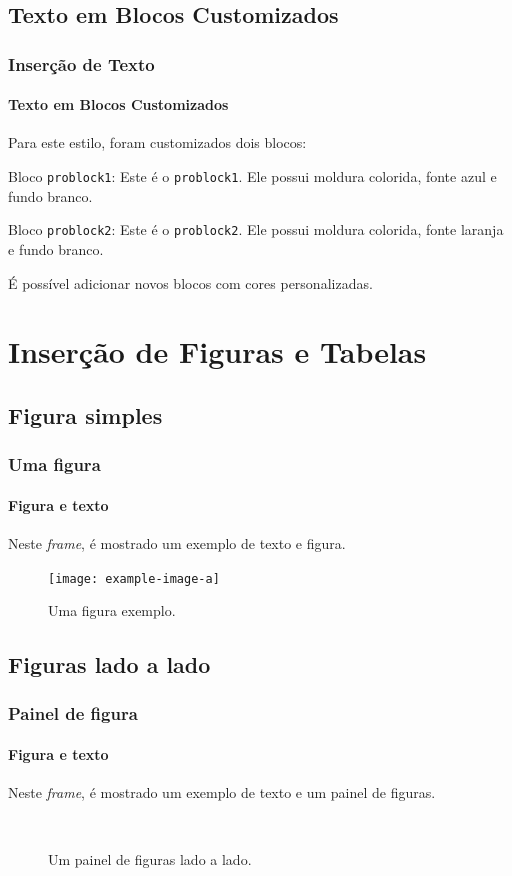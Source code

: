 \documentclass[10pt,aspectratio=169]{beamer}
\begin{document}
\subsection{Texto em Blocos Customizados}

\begin{frame}
\frametitle{Inserção de Texto}
\framesubtitle{Texto em Blocos Customizados}
Para este estilo, foram customizados dois blocos:
\begin{problock1}{Bloco {\tt problock1}:}
Este é o {\tt problock1}. Ele possui moldura colorida, fonte azul e fundo branco.
\end{problock1}

\pause

\begin{problock2}{Bloco {\tt problock2}:}
Este é o {\tt problock2}. Ele possui moldura colorida, fonte laranja e fundo branco.
\end{problock2}

\pause

É possível adicionar novos blocos com cores personalizadas.
\end{frame}

\section{Inserção de Figuras e Tabelas}

\subsection{Figura simples}

\begin{frame}
\frametitle{Uma figura}
\framesubtitle{Figura e texto}
Neste \textit{frame}, é mostrado um exemplo de texto e figura.
\pause
\begin{figure}
	\centering
	\texttt{[image: example-image-a]}
	\caption{Uma figura exemplo.}
\end{figure}
\end{frame}

\subsection{Figuras lado a lado}

\begin{frame}
\frametitle{Painel de figura}
\framesubtitle{Figura e texto}
Neste \textit{frame}, é mostrado um exemplo de texto e um painel de figuras.
\pause
\begin{figure}[H]
    \begin{center}
         \\
        \caption{Um painel de figuras lado a lado.}
    \end{center}
\end{figure}
\end{frame}
\end{document}
